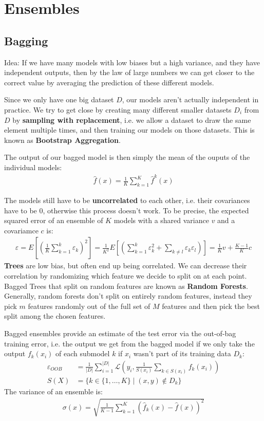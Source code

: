 \documentclass{report}
\renewcommand\epsilon{\varepsilon}
\newcommand{\tbf}{\textbf}
\newcommand*{\newpar}{\par\vspace{\baselineskip}\noindent}
\newcommand{\loss}{\mathcal{L}}
\begin{document}
\chapter{Ensembles}
\section{Bagging}
Idea: If we have many models with low biases but a high variance, and they have independent outputs, then by the law of large numbers we can get closer to the correct value by averaging the prediction of these different models.
\newpar
Since we only have one big dataset $D$, our models aren't actually independent in practice. We try to get close by creating many different smaller datasets $D_i$ from $D$ by \tbf{sampling with replacement}, i.e. we allow a dataset to draw the same element multiple times, and then training our models on those datasets. This is known as \tbf{Bootstrap Aggregation}.
\newpar
The output of our bagged model is then simply the mean of the ouputs of the individual models:
\begin{align}
 \hat{f}(x) = \frac{1}{K} \sum_{k=1}^K \hat{f}^k(x)
\end{align}
\newpar
The models still have to be \tbf{uncorrelated} to each other, i.e. their covariances have to be $0$, otherwise this process doesn't work. To be precise, the expected squared error of an ensemble of $K$ models with a shared variance $v$ and a covariamce $c$ is:
\begin{align}
 \epsilon = E\left[\left(\frac{1}{K}\sum_{k=1}^k \epsilon_k\right)^2\right] = \frac{1}{K^2}E\left[\left(\sum_{k=1}^k \epsilon_k^2 + \sum_{k \neq l} \epsilon_k \epsilon_l\right)\right] = \frac{1}{K}v + \frac{K-1}{K}c
\end{align}
\tbf{Trees} are low bias, but often end up being correlated. We can decrease their correlation by randomizing which feature we decide to split on at each point. Bagged Trees that split on random features are known as \tbf{Random Forests}. Generally, random forests don't split on entirely random features, instead they pick $m$ features randomly out of the full set of $M$ features and then pick the best split among the chosen features.
\newpar
Bagged ensembles provide an estimate of the test error via the out-of-bag training error, i.e. the output we get from the bagged model if we only take the output $f_k(x_i)$ of each submodel $k$ if $x_i$ wasn't part of its training data $D_k$:
\begin{align}
 \epsilon_{OOB}& = \frac{1}{|D|} \sum_{i=1}^{|D|} \loss\left(y_i, \frac{1}{S(x_i)} \sum_{k \in S(x_i)}f_k(x_i)\right)\\
 S(X) &= \{k \in \{1, \hdots, K\} \mid (x,y) \notin D_{k}\}
\end{align}
The variance of an ensemble is:
\begin{align}
 \sigma(x) = \sqrt{\frac{1}{K-1}\sum_{k=1}^K \left(\hat{f}_k(x) -\hat{f}(x)\right)^2}
\end{align}
%
\end{document}

